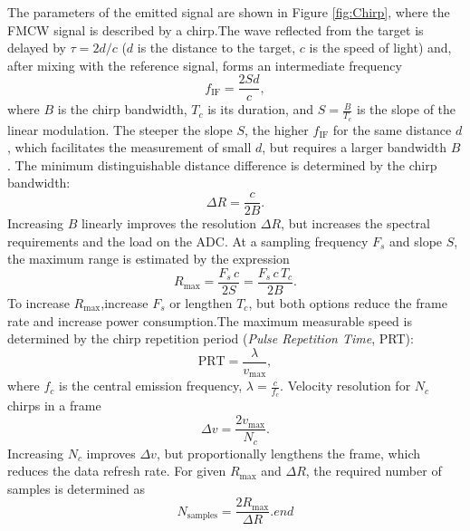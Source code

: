 The parameters of the emitted signal are shown in Figure \ref{fig:Chirp}, where the FMCW signal is described by a chirp.The wave reflected from the target is delayed by $\tau = 2d/c$ ($d$ is the distance to the target, $c$ is the speed of light) and, after mixing with the reference signal, forms an intermediate frequency 
\begin{equation}f_{\text{IF}} = \frac{2 S d}{c},\label{eq:if_freq}
\end{equation}where $B$ is the chirp bandwidth, $T_c$ is its duration, and $S = \frac{B}{T_c}$ is the slope of the linear modulation. The steeper the slope $S$, the higher $f_{\text{IF}}$ for the same distance $d$, which facilitates the measurement of small $d$, but requires a larger bandwidth $B$. The minimum distinguishable distance difference is determined by the chirp bandwidth:
\begin{equation}
\Delta R = \frac{c}{2B}.\label{eq:range_res}
\end{equation}Increasing $B$ linearly improves the resolution $\Delta R$, but increases the spectral requirements and the load on the ADC. At a sampling frequency $F_s$ and slope $S$, the maximum range is estimated by the expression 
\begin{equation}R_{\max} = \frac{F_s\,c}{2S} =\frac{F_s\,c\,T_c}{2B}.\label{eq:max_range}
\end{equation}To increase $R_{\max}$,increase $F_s$ or lengthen $T_c$, but both options reduce the frame rate and increase power consumption.The maximum measurable speed is determined by the chirp repetition period (\textit{Pulse Repetition Time}, PRT):
\begin{equation}
\text{PRT} = \frac{\lambda}{v_{\max}},\label{eq:prt}
\end{equation}
where $f_c$ is the central emission frequency, $\lambda = \frac{c}{f_c}$. Velocity resolution for $N_c$ chirps in a frame
\begin{equation}\Delta v = \frac{2 v_{\max}}{N_c}.\label{eq:vel_res}
\end{equation}Increasing $N_c$ improves $\Delta v$, but proportionally lengthens the frame, which reduces the data refresh rate. For given $R_{\max}$ and $\Delta R$, the required number of samples is determined as
\begin{equation}N_{\text{samples}} = \frac{2 R_{\max}}{\Delta R}. \label{eq:samples} end 
\end{equation}


